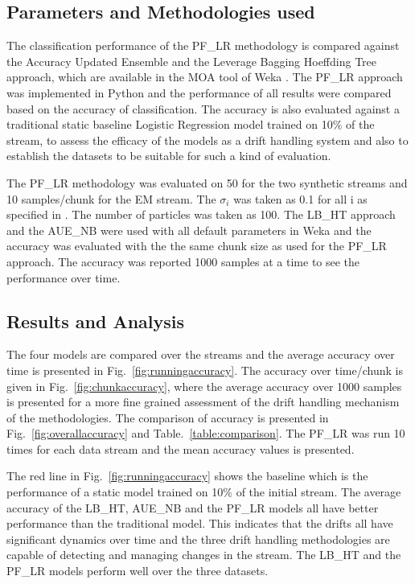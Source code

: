 \documentclass[conference]{IEEEtran}
\begin{document}
\subsection{Parameters and Methodologies used}
The classification performance of the PF\_LR methodology is compared against the Accuracy Updated Ensemble and the Leverage Bagging Hoeffding Tree approach, which are available in the MOA tool of Weka \cite{moa}. The PF\_LR approach was implemented in Python and the performance of all results were compared based on the accuracy of classification. The accuracy is also evaluated against a traditional static baseline Logistic Regression model trained on 10\% of the stream, to assess the efficacy of the models as a drift handling system and also to establish the datasets to be suitable for such a kind of evaluation. 

The PF\_LR methodology was evaluated on 50 for the two synthetic streams and 10 samples/chunk for the EM stream. The $\sigma_i$ was taken as 0.1 for all i as specified in \cite{pflr}. The number of particles was taken as 100. The LB\_HT approach and the AUE\_NB were used with all default parameters in Weka and the accuracy was evaluated with the the same chunk size as used for the PF\_LR approach. The accuracy was reported 1000 samples at a time to see the performance over time. 

\subsection{Results and Analysis}
The four models are compared over the streams and the average accuracy over time is presented in Fig.~\ref{fig:runningaccuracy}. The accuracy over time/chunk is given in Fig.~\ref{fig:chunkaccuracy}, where the average accuracy over 1000 samples is presented for a more fine grained assessment of the drift handling mechanism of the methodologies. The comparison of accuracy is presented in Fig.~\ref{fig:overallaccuracy} and Table.~\ref{table:comparison}. The PF\_LR was run 10 times for each data stream and the mean accuracy values is presented.

The red line in Fig.~\ref{fig:runningaccuracy} shows the baseline which is the performance of a static model trained on 10\% of the initial stream. The average accuracy of the LB\_HT, AUE\_NB and the PF\_LR models all have better performance than the traditional model. This indicates that the drifts all have significant dynamics over time and the three drift handling  methodologies are capable of detecting and managing changes in the stream. The LB\_HT and the PF\_LR models perform well over the three datasets. 
\end{document}
